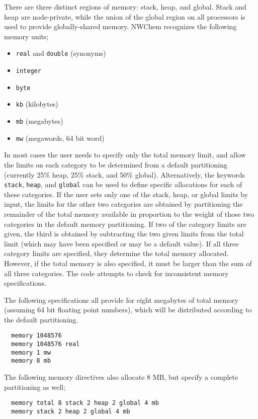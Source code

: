 There are three distinct regions of memory: stack, heap, and global.
Stack and heap are node-private, while the union of the global region
on all processors is used to provide globally-shared memory.  NWChem
recognizes the following memory units;
\begin{itemize}
\item \verb+real+ and \verb+double+ (synonyms)
\item \verb+integer+
\item \verb+byte+
\item \verb+kb+ (kilobytes)
\item \verb+mb+ (megabytes)
\item \verb+mw+ (megawords, 64 bit word)
\end{itemize}

In most cases the user needs to specify only the total memory limit,
and allow the limits on each category to be determined from a default
partitioning (currently 25\% heap, 25\% stack, and 50\% global).
Alternatively, the keywords \verb+stack+, \verb+heap+, and
\verb+global+ can be used to define specific allocations for each of
these categories.  If the user sets only one of the stack, heap, or
global limits by input, the limits for the other two categories are
obtained by partitioning the remainder of the total memory available
in proportion to the weight of those two categories in the default
memory partitioning.  If two of the category limits are given, the
third is obtained by subtracting the two given limits from the total
limit (which may have been specified or may be a default value).  If
all three category limits are specified, they determine the total
memory allocated.  However, if the total memory is also specified, it
must be larger than the sum of all three categories.  The code
attempts to check for inconsistent memory specifications.

The following specifications all provide for eight megabytes of total memory 
(assuming 64 bit floating point numbers), which
will be distributed according to the default partitioning.
\begin{verbatim}
  memory 1048576
  memory 1048576 real
  memory 1 mw
  memory 8 mb
\end{verbatim}

The following memory directives also allocate 8 MB, but specify a complete
partitioning as well;

\begin{verbatim}
  memory total 8 stack 2 heap 2 global 4 mb
  memory stack 2 heap 2 global 4 mb
\end{verbatim}

